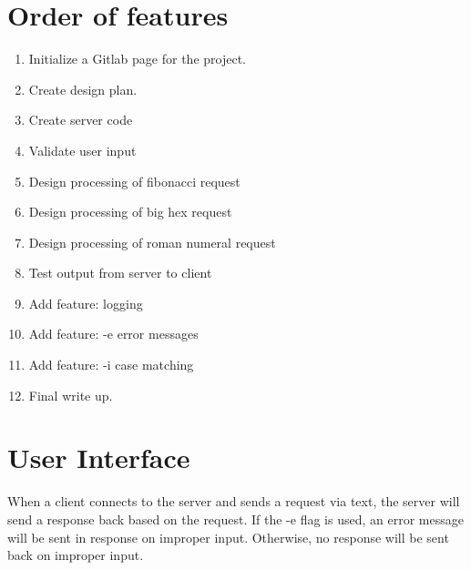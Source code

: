 \documentclass[12pt]{article}
\begin{document}
	\section{Order of features}
		\begin{enumerate}
			\item Initialize a Gitlab page for the project.
			\item Create design plan.
			\item Create server code
			\item Validate user input
			\item Design processing of fibonacci request
			\item Design processing of big hex request
			\item Design processing of roman numeral request
			\item Test output from server to client
			\item Add feature: logging
			\item Add feature: -e error messages
			\item Add feature: -i case matching
			\item Final write up.
		\end{enumerate}
	\section{User Interface}
		When a client connects to the server and sends a request via
		text, the server will send a response back based on the
		request. If the -e flag is used, an error message will be sent
		in response on improper input. Otherwise, no response will
		be sent back on improper input.
\end{document}
